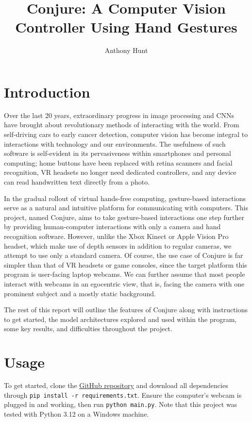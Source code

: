 \documentclass{article}
\title{Conjure: A Computer Vision Controller Using Hand Gestures}
\author{Anthony Hunt}
\begin{document}
\maketitle

\section{Introduction}
Over the last 20 years, extraordinary progress in image processing and CNNs have brought about revolutionary methods of interacting with the world. From self-driving cars to early cancer detection, computer vision has become integral to interactions with technology and our environments. The usefulness of such software is self-evident in its pervasiveness within smartphones and personal computing; home buttons have been replaced with retina scanners and facial recognition, VR headsets no longer need dedicated controllers, and any device can read handwritten text directly from a photo.

In the gradual rollout of virtual hands-free computing, gesture-based interactions serve as a natural and intuitive platform for communicating with computers. This project, named Conjure, aims to take gesture-based interactions one step further by providing human-computer interactions with only a camera and hand recognition software. However, unlike the Xbox Kinect or Apple Vision Pro headset, which make use of depth sensors in addition to regular cameras, we attempt to use only a standard camera. Of course, the use case of Conjure is far simpler than that of VR headsets or game consoles, since the target platform this program is user-facing laptop webcams. We can further assume that most people interact with webcams in an egocentric view, that is, facing the camera with one prominent subject and a mostly static background.

The rest of this report will outline the features of Conjure along with instructions to get started, the model architectures explored and used within the program, some key results, and difficulties throughout the project.

\section{Usage}
To get started, clone the \href{https://github.com/Ant13731/conjure}{GitHub repository} and download all dependencies through \texttt{pip install -r requirements.txt}. Ensure the computer's webcam is plugged in and working, then run \texttt{python main.py}. Note that this project was tested with Python 3.12 on a Windows machine.
\end{document}
